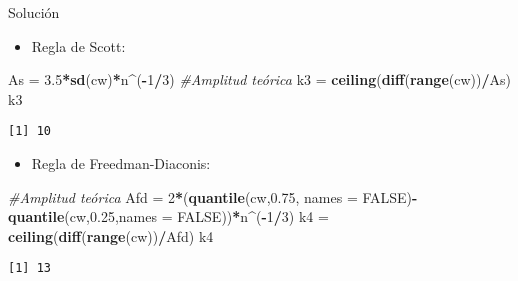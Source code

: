 \documentclass[
  ignorenonframetext,
]{beamer}
\newenvironment{Shaded}{\begin{snugshade}}{\end{snugshade}}
\newcommand{\CommentTok}[1]{\textcolor[rgb]{0.56,0.35,0.01}{\textit{#1}}}
\newcommand{\DataTypeTok}[1]{\textcolor[rgb]{0.13,0.29,0.53}{#1}}
\newcommand{\DecValTok}[1]{\textcolor[rgb]{0.00,0.00,0.81}{#1}}
\newcommand{\FloatTok}[1]{\textcolor[rgb]{0.00,0.00,0.81}{#1}}
\newcommand{\KeywordTok}[1]{\textcolor[rgb]{0.13,0.29,0.53}{\textbf{#1}}}
\newcommand{\NormalTok}[1]{#1}
\newcommand{\OperatorTok}[1]{\textcolor[rgb]{0.81,0.36,0.00}{\textbf{#1}}}
\newcommand{\OtherTok}[1]{\textcolor[rgb]{0.56,0.35,0.01}{#1}}
\newcommand{\StringTok}[1]{\textcolor[rgb]{0.31,0.60,0.02}{#1}}
\providecommand{\tightlist}{%
  \setlength{\itemsep}{0pt}\setlength{\parskip}{0pt}}
\begin{document}
\begin{frame}[fragile]{Solución}
\protect\hypertarget{soluciuxf3n-2}{}
\begin{itemize}
\tightlist
\item
  Regla de Scott:
\end{itemize}

\begin{Shaded}
\begin{Highlighting}[]
\NormalTok{As =}\StringTok{ }\FloatTok{3.5}\OperatorTok{*}\KeywordTok{sd}\NormalTok{(cw)}\OperatorTok{*}\NormalTok{n}\OperatorTok{\^{}}\NormalTok{(}\OperatorTok{{-}}\DecValTok{1}\OperatorTok{/}\DecValTok{3}\NormalTok{) }\CommentTok{\#Amplitud teórica}
\NormalTok{k3 =}\StringTok{ }\KeywordTok{ceiling}\NormalTok{(}\KeywordTok{diff}\NormalTok{(}\KeywordTok{range}\NormalTok{(cw))}\OperatorTok{/}\NormalTok{As)}
\NormalTok{k3}
\end{Highlighting}
\end{Shaded}

\begin{verbatim}
[1] 10
\end{verbatim}

\begin{itemize}
\tightlist
\item
  Regla de Freedman-Diaconis:
\end{itemize}

\begin{Shaded}
\begin{Highlighting}[]
\CommentTok{\#Amplitud teórica}
\NormalTok{Afd =}\StringTok{ }\DecValTok{2}\OperatorTok{*}\NormalTok{(}\KeywordTok{quantile}\NormalTok{(cw,}\FloatTok{0.75}\NormalTok{, }\DataTypeTok{names =} \OtherTok{FALSE}\NormalTok{)}\OperatorTok{{-}}\KeywordTok{quantile}\NormalTok{(cw,}\FloatTok{0.25}\NormalTok{,}\DataTypeTok{names =} \OtherTok{FALSE}\NormalTok{))}\OperatorTok{*}\NormalTok{n}\OperatorTok{\^{}}\NormalTok{(}\OperatorTok{{-}}\DecValTok{1}\OperatorTok{/}\DecValTok{3}\NormalTok{) }
\NormalTok{k4 =}\StringTok{ }\KeywordTok{ceiling}\NormalTok{(}\KeywordTok{diff}\NormalTok{(}\KeywordTok{range}\NormalTok{(cw))}\OperatorTok{/}\NormalTok{Afd)}
\NormalTok{k4}
\end{Highlighting}
\end{Shaded}

\begin{verbatim}
[1] 13
\end{verbatim}
\end{frame}
\end{document}
